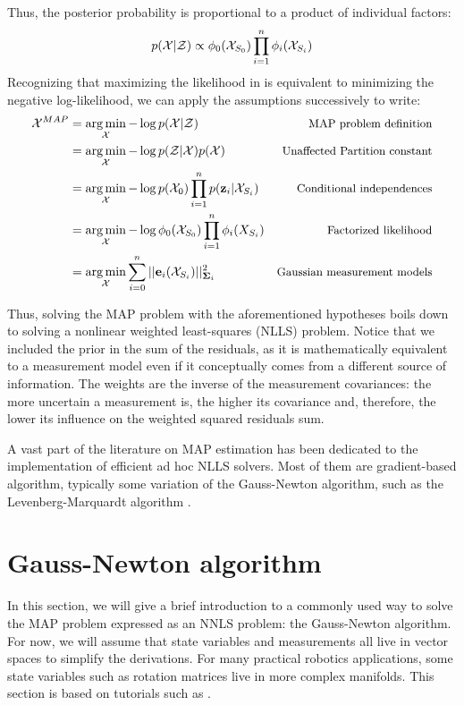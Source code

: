 Thus, the posterior probability is proportional to a product of individual factors:
%
\begin{equation}
    p(\mathcal{X} | \mathcal{Z}) \propto \phi_0(\mathcal{X}_{S_0}) \prod_{i=1}^{n} \phi_i(\mathcal{X}_{S_i}) 
    \label{eq:likelihood_factorization}
\end{equation}
%
Recognizing that maximizing the likelihood in  is equivalent to minimizing the negative log-likelihood, we can
apply the assumptions successively to write:
%
\begin{align}
    \mathcal{X}^{MAP} 
    &= \operatorname*{arg\,min}_{\mathcal{X}} - \log p(\mathcal{X} | \mathcal{Z}) &\text{\small MAP problem definition}
    \\
    &= \operatorname*{arg\,min}_{\mathcal{X}} - \log p(\mathcal{Z} | \mathcal{X}) p(\mathcal{X}) &\text{\small Unaffected Partition constant}
    \\
    &= \operatorname*{arg\,min}_{\mathcal{X}} - \log p(\mathcal{X}_0) \prod_{i=1}^{n} p({\bf z}_i | \mathcal{X}_{S_i})  &\text{\small Conditional independences}
    \\
    &= \operatorname*{arg\,min}_{\mathcal{X}} - \log \phi_0(\mathcal{X}_{S_0}) \prod_{i=1}^{n} \phi_i(X_{S_i}) &\text{\small Factorized likelihood}
    \\
    &= \operatorname*{arg\,min}_{\mathcal{X}}  \sum_{i=0}^{n} ||{\bf e}_i(\mathcal{X}_{S_i})||_{{\bm \Sigma}_i}^2  &\text{\small Gaussian measurement models}
\end{align}

Thus, solving the MAP problem with the aforementioned hypotheses boils down to solving a nonlinear weighted least-squares (NLLS) problem.
Notice that we included the prior in the sum of the residuals, as it is mathematically equivalent to a measurement model even if it conceptually
comes from a different source of information. 
The weights are the inverse of the measurement covariances: the more uncertain a measurement is, the higher its covariance and, therefore, the lower its influence
on the weighted squared residuals sum. 

A vast part of the literature on MAP estimation has been dedicated to the implementation of efficient ad hoc NLLS solvers. Most of them are 
gradient-based algorithm, typically some variation of the Gauss-Newton algorithm, such as the Levenberg-Marquardt algorithm \cite{boyd2004convex}.





%
%
%
%
%
%
%
\section{Gauss-Newton algorithm}
In this section, we will give a brief introduction to a commonly used way to solve the MAP problem expressed as an NNLS problem: the Gauss-Newton algorithm.
For now, we will assume that state variables and measurements all live in vector spaces to simplify the derivations. For many practical robotics applications,
some state variables such as rotation matrices live in more complex manifolds. This section is based on tutorials such as \cite{dellaert2017factor,sola2017course}. 

